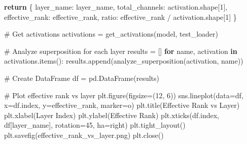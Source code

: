 \documentclass[
  letterpaper,
  DIV=11,
  numbers=noendperiod]{scrreprt}
\newenvironment{Shaded}{\begin{snugshade}}{\end{snugshade}}
\newcommand{\CommentTok}[1]{\textcolor[rgb]{0.37,0.37,0.37}{#1}}
\newcommand{\ControlFlowTok}[1]{\textcolor[rgb]{0.00,0.23,0.31}{\textbf{#1}}}
\newcommand{\DecValTok}[1]{\textcolor[rgb]{0.68,0.00,0.00}{#1}}
\newcommand{\KeywordTok}[1]{\textcolor[rgb]{0.00,0.23,0.31}{\textbf{#1}}}
\newcommand{\NormalTok}[1]{\textcolor[rgb]{0.00,0.23,0.31}{#1}}
\newcommand{\OperatorTok}[1]{\textcolor[rgb]{0.37,0.37,0.37}{#1}}
\newcommand{\StringTok}[1]{\textcolor[rgb]{0.13,0.47,0.30}{#1}}
\begin{document}
\begin{Shaded}
\begin{Highlighting}[]
    \ControlFlowTok{return}\NormalTok{ \{}
        \StringTok{\textquotesingle{}layer\_name\textquotesingle{}}\NormalTok{: layer\_name,}
        \StringTok{\textquotesingle{}total\_channels\textquotesingle{}}\NormalTok{: activation.shape[}\DecValTok{1}\NormalTok{],}
        \StringTok{\textquotesingle{}effective\_rank\textquotesingle{}}\NormalTok{: effective\_rank,}
        \StringTok{\textquotesingle{}ratio\textquotesingle{}}\NormalTok{: effective\_rank }\OperatorTok{/}\NormalTok{ activation.shape[}\DecValTok{1}\NormalTok{]}
\NormalTok{    \}}

\CommentTok{\# Get activations}
\NormalTok{activations }\OperatorTok{=}\NormalTok{ get\_activations(model, test\_loader)}

\CommentTok{\# Analyze superposition for each layer}
\NormalTok{results }\OperatorTok{=}\NormalTok{ []}
\ControlFlowTok{for}\NormalTok{ name, activation }\KeywordTok{in}\NormalTok{ activations.items():}
\NormalTok{    results.append(analyze\_superposition(activation, name))}

\CommentTok{\# Create DataFrame}
\NormalTok{df }\OperatorTok{=}\NormalTok{ pd.DataFrame(results)}

\CommentTok{\# Plot effective rank vs layer}
\NormalTok{plt.figure(figsize}\OperatorTok{=}\NormalTok{(}\DecValTok{12}\NormalTok{, }\DecValTok{6}\NormalTok{))}
\NormalTok{sns.lineplot(data}\OperatorTok{=}\NormalTok{df, x}\OperatorTok{=}\NormalTok{df.index, y}\OperatorTok{=}\StringTok{\textquotesingle{}effective\_rank\textquotesingle{}}\NormalTok{, marker}\OperatorTok{=}\StringTok{\textquotesingle{}o\textquotesingle{}}\NormalTok{)}
\NormalTok{plt.title(}\StringTok{\textquotesingle{}Effective Rank vs Layer\textquotesingle{}}\NormalTok{)}
\NormalTok{plt.xlabel(}\StringTok{\textquotesingle{}Layer Index\textquotesingle{}}\NormalTok{)}
\NormalTok{plt.ylabel(}\StringTok{\textquotesingle{}Effective Rank\textquotesingle{}}\NormalTok{)}
\NormalTok{plt.xticks(df.index, df[}\StringTok{\textquotesingle{}layer\_name\textquotesingle{}}\NormalTok{], rotation}\OperatorTok{=}\DecValTok{45}\NormalTok{, ha}\OperatorTok{=}\StringTok{\textquotesingle{}right\textquotesingle{}}\NormalTok{)}
\NormalTok{plt.tight\_layout()}
\NormalTok{plt.savefig(}\StringTok{\textquotesingle{}effective\_rank\_vs\_layer.png\textquotesingle{}}\NormalTok{)}
\NormalTok{plt.close()}


\end{Highlighting}
\end{Shaded}
\end{document}
